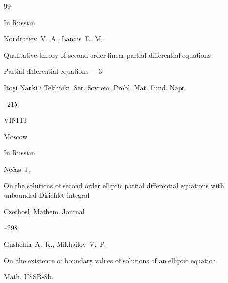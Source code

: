 \begin{thebibliography}{99}




\lang In Russian

\by Kondratiev~V.~A., Landis~E.~M.

\paper Qualitative theory of second order linear partial differential equations

\inbook Partial differential equations~--~3

\serial Itogi Nauki i Tekhniki. Ser. Sovrem. Probl. Mat. Fund. Napr.



--215

\publ VINITI

\publaddr Moscow







\lang In Russian



\by Ne\v{c}as~J.

\paper On the solutions of second order elliptic partial differential equations with unbounded Dirichlet integral

\jour  Czechosl. Mathem. Journal




--298








\by Gushchin~A.~K., Mikhailov~V.~P.

\paper On~the existence of boundary values of solutions of an elliptic equation

\jour Math. USSR-Sb.




\end{thebibliography}
